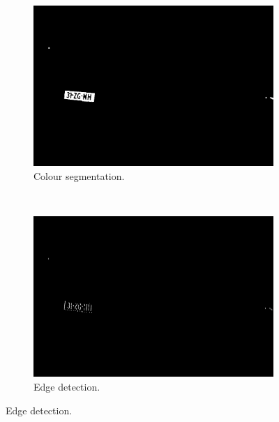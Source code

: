 \begin{figure}[h]
        \centering
        \begin{subfigure}{0.33\textwidth}
            \includegraphics[width=\textwidth]{plaatjes/yellow-segment}
            \caption{Colour segmentation.}
            \label{fig:color-segmented}
        \end{subfigure}%
        ~ 
        \begin{subfigure}{0.33\textwidth}
            \includegraphics[width=\textwidth]{plaatjes/edge-detection}
            \caption{Edge detection.}
            \label{fig:edge-detected}
        \end{subfigure}%


\end{figure}
